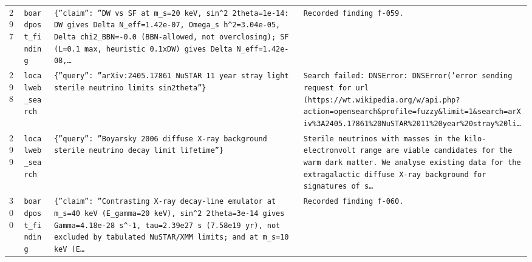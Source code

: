 \documentclass[11pt,a4paper]{article}
\begin{document}
\begin{longtable}{@{}p{}p{}p{}p{}@{}}
297 & \texttt{board}\newline\texttt{post\_\allowbreak{}finding} & \texttt{\{''claim'':\allowbreak{} ''DW vs SF at m\_\allowbreak{}s=\allowbreak{}20 keV,\allowbreak{} sin\textasciicircum{}\allowbreak{}2 2theta=\allowbreak{}1e-14:\allowbreak{} DW gives Delta N\_\allowbreak{}eff=\allowbreak{}1.42e-07,\allowbreak{} Omega\_\allowbreak{}s h\textasciicircum{}\allowbreak{}2=\allowbreak{}3.04e-05,\allowbreak{} Delta chi2\_\allowbreak{}BBN=\allowbreak{}-0.0 (BBN-allowed,\allowbreak{} not overclosing)\allowbreak{};\allowbreak{} SF (L=\allowbreak{}0.1 max,\allowbreak{} heuristic 0.1xDW)\allowbreak{} gives Delta N\_\allowbreak{}eff=\allowbreak{}1.42e-08,\allowbreak{}\ldots{}\allowbreak{}} & \texttt{Recorded finding f-059.} \\
298 & \texttt{local}\newline\texttt{web\_\allowbreak{}search} & \texttt{\{''query'':\allowbreak{} ''arXiv:\allowbreak{}2405.17861 NuSTAR 11 year stray light sterile neutrino limits sin2theta''\}\allowbreak{}} & \texttt{Search failed:\allowbreak{} DNSError:\allowbreak{} DNSError('error sending request for url (https:\allowbreak{}/\allowbreak{}/\allowbreak{}wt.wikipedia.org/\allowbreak{}w/\allowbreak{}api.php?action=\allowbreak{}opensearch\&profile=\allowbreak{}fuzzy\&limit=\allowbreak{}1\&search=\allowbreak{}arXiv\%3A2405.17861\%20NuSTAR\%2011\%20year\%20stray\%20li\ldots{}\allowbreak{}} \\
299 & \texttt{local}\newline\texttt{web\_\allowbreak{}search} & \texttt{\{''query'':\allowbreak{} ''Boyarsky 2006 diffuse X-ray background sterile neutrino decay limit lifetime''\}\allowbreak{}} & \texttt{Sterile neutrinos with masses in the kilo-electronvolt range are viable candidates for the warm dark matter. We analyse existing data for the extragalactic diffuse X-ray background for signatures of s\ldots{}\allowbreak{}} \\
300 & \texttt{board}\newline\texttt{post\_\allowbreak{}finding} & \texttt{\{''claim'':\allowbreak{} ''Contrasting X-ray decay-line emulator at m\_\allowbreak{}s=\allowbreak{}40 keV (E\_\allowbreak{}gamma=\allowbreak{}20 keV)\allowbreak{},\allowbreak{} sin\textasciicircum{}\allowbreak{}2 2theta=\allowbreak{}3e-14 gives Gamma=\allowbreak{}4.18e-28 s\textasciicircum{}\allowbreak{}-1,\allowbreak{} tau=\allowbreak{}2.39e27 s (7.58e19 yr)\allowbreak{},\allowbreak{} not excluded by tabulated NuSTAR/\allowbreak{}XMM limits;\allowbreak{} and at m\_\allowbreak{}s=\allowbreak{}10 keV (E\ldots{}\allowbreak{}} & \texttt{Recorded finding f-060.} \\

\end{longtable}
\end{document}
